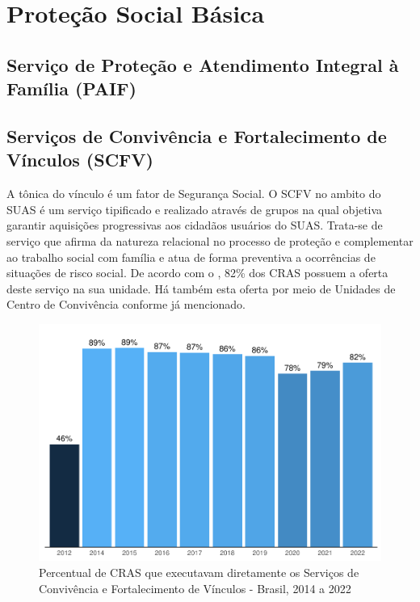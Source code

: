 \documentclass[
  brazilian]{report}
\begin{document}
\hypertarget{proteuxe7uxe3o-social-buxe1sica}{%
\section{Proteção Social Básica}\label{proteuxe7uxe3o-social-buxe1sica}}

\hypertarget{serviuxe7o-de-proteuxe7uxe3o-e-atendimento-integral-uxe0-famuxedlia-paif}{%
\subsection{Serviço de Proteção e Atendimento Integral à Família
(PAIF)}\label{serviuxe7o-de-proteuxe7uxe3o-e-atendimento-integral-uxe0-famuxedlia-paif}}

\hypertarget{serviuxe7os-de-convivuxeancia-e-fortalecimento-de-vuxednculos-scfv}{%
\subsection{Serviços de Convivência e Fortalecimento de Vínculos
(SCFV)}\label{serviuxe7os-de-convivuxeancia-e-fortalecimento-de-vuxednculos-scfv}}

A tônica do vínculo é um fator de Segurança Social. O SCFV no ambito do
SUAS é um serviço tipificado e realizado através de grupos na qual
objetiva garantir aquisições progressivas aos cidadãos usuários do SUAS.
Trata-se de serviço que afirma da natureza relacional no processo de
proteção e complementar ao trabalho social com família e atua de forma
preventiva a ocorrências de situações de risco social. De acordo com o
, 82\% dos CRAS possuem a oferta deste serviço na
sua unidade. Há também esta oferta por meio de Unidades de Centro de
Convivência conforme já mencionado.

\begin{figure}
\includegraphics{Censo-SUAS-2022_files/figure-latex/CRAS-SCFV-1} \caption[Percentual de CRAS que executavam diretamente os Serviços de Convivência e Fortalecimento de Vínculos - Brasil, 2014 a 2022]{Percentual de CRAS que executavam diretamente os Serviços de Convivência e Fortalecimento de Vínculos - Brasil, 2014 a 2022}\label{fig:CRAS-SCFV}
\end{figure}
\end{document}
